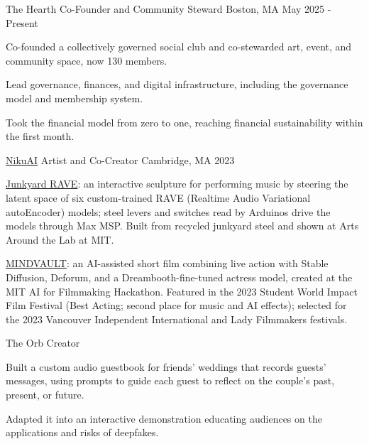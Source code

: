 


\begin{cventries}

\cventry
{The Hearth}
{Co-Founder and Community Steward}
{Boston, MA}
{May 2025 - Present}
{
\begin{cvitems}
\item Co-founded a collectively governed social club and co-stewarded art, event, and community space, now 130 members.
\item Lead governance, finances, and digital infrastructure, including the governance model and membership system.
\item Took the financial model from zero to one, reaching financial sustainability within the first month.
\end{cvitems}
}

\cventry
{\href{https://www.niku.ai}{NikuAI}}
{Artist and Co-Creator}
{Cambridge, MA}
{2023}
{
\begin{cvitems}
\item \href{https://www.niku.ai/junkyard-rave/}{Junkyard RAVE}: an interactive sculpture for performing music by steering the latent space of six custom-trained RAVE (Realtime Audio Variational autoEncoder) models; steel levers and switches read by Arduinos drive the models through Max MSP. Built from recycled junkyard steel and shown at Arts Around the Lab at MIT.
\item \href{https://www.niku.ai/mindvault/}{MINDVAULT}: an AI-assisted short film combining live action with Stable Diffusion, Deforum, and a Dreambooth-fine-tuned actress model, created at the MIT AI for Filmmaking Hackathon. Featured in the 2023 Student World Impact Film Festival (Best Acting; second place for music and AI effects); selected for the 2023 Vancouver Independent International and Lady Filmmakers festivals.
\end{cvitems}
}

\cventry
{The Orb}
{Creator}
{}
{}
{
\begin{cvitems}
\item Built a custom audio guestbook for friends' weddings that records guests' messages, using prompts to guide each guest to reflect on the couple's past, present, or future.
\item Adapted it into an interactive demonstration educating audiences on the applications and risks of deepfakes.
\end{cvitems}
}


\end{cventries}
